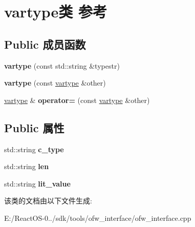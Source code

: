 \hypertarget{classvartype}{}\section{vartype类 参考}
\label{classvartype}
\subsection*{Public 成员函数}
\begin{DoxyCompactItemize}
\item 
\mbox{\label{classvartype_a262031fc136231b1424f7fd038c8e3c1}} 
{\bfseries vartype} (const std\+::string \&typestr)
\item 
\mbox{\label{classvartype_a9b96b8de81f48b4305188be67f7608be}} 
{\bfseries vartype} (const \hyperlink{classvartype}{vartype} \&other)
\item 
\mbox{\label{classvartype_a411d19737791c064f6e75b01642fad23}} 
\hyperlink{classvartype}{vartype} \& {\bfseries operator=} (const \hyperlink{classvartype}{vartype} \&other)
\end{DoxyCompactItemize}
\subsection*{Public 属性}
\begin{DoxyCompactItemize}
\item 
\mbox{\label{classvartype_ab58cea15496e47d0503674a057013a8c}} 
std\+::string {\bfseries c\+\_\+type}
\item 
\mbox{\label{classvartype_ac1b0d8f27931bd0f3ddc3562837cebd4}} 
std\+::string {\bfseries len}
\item 
\mbox{\label{classvartype_a5328b9f0dc2ad5b98a330305bd5388b9}} 
std\+::string {\bfseries lit\+\_\+value}
\end{DoxyCompactItemize}


该类的文档由以下文件生成\+:\begin{DoxyCompactItemize}
\item 
E\+:/\+React\+O\+S-\/0../sdk/tools/ofw\+\_\+interface/ofw\+\_\+interface.\+cpp\end{DoxyCompactItemize}
